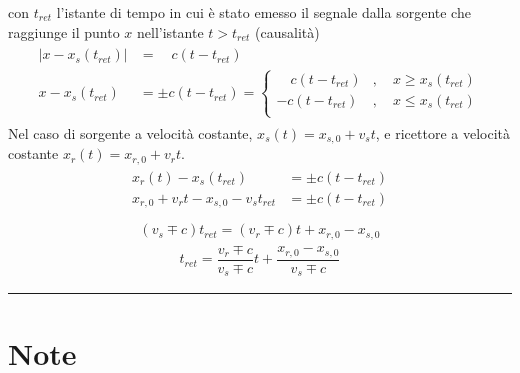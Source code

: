 \documentclass[letterpaper,10pt,italian]{jupyterBook}
\begin{document}
\sphinxAtStartPar
con \(t_{ret}\) l’istante di tempo in cui è stato emesso il segnale dalla sorgente che raggiunge il punto \(x\) nell’istante \(t > t_{ret}\) (causalità)
\begin{equation*}
\begin{split}\begin{aligned}
 | x - x_s(t_{ret}) | & = \quad  c (t - t_{ret}) \\
   x - x_s(t_{ret})   & = \pm c (t - t_{ret}) = \begin{cases} \quad c ( t-t_{ret} ) & , \quad x \ge x_s(t_{ret}) \\ - c ( t-t_{ret} ) & , \quad  x \le x_s(t_{ret}) \\ \end{cases}
\end{aligned}\end{split}
\end{equation*}
\sphinxAtStartPar
Nel caso di sorgente a velocità costante, \(x_s(t) = x_{s,0} + v_s t\), e ricettore a velocità costante \(x_r(t) = x_{r,0} + v_r t\).
\begin{equation*}
\begin{split}\begin{aligned}
  x_r(t) -x_s(t_{ret}) & = \pm c ( t - t_{ret} ) \\
  x_{r,0} + v_r t - x_{s,0} - v_s t_{ret} & = \pm c ( t - t_{ret} ) \\
\end{aligned}\end{split}
\end{equation*}\begin{equation*}
\begin{split}(v_s \mp c) t_{ret} = (v_r \mp c) t + x_{r,0} - x_{s,0}\end{split}
\end{equation*}\begin{equation*}
\begin{split}t_{ret} = \dfrac{v_r \mp c}{v_s \mp c} t + \dfrac{x_{r,0} - x_{s,0}}{v_s \mp c}\end{split}
\end{equation*}



\bigskip\hrule\bigskip


\sphinxstepscope


\section{Note}
\label{\detokenize{ch/waves/waves-notes:note}}\label{\detokenize{ch/waves/waves-notes:physics-hs-waves-notes}}\label{\detokenize{ch/waves/waves-notes::doc}}
\end{document}
